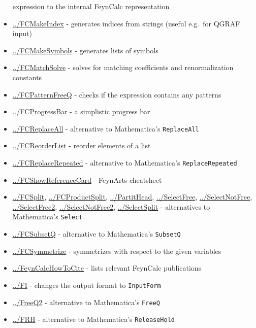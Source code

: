 \documentclass[../FeynCalcManual.tex]{subfiles}
\begin{document}
\begin{itemize}
  expression to the internal FeynCalc representation
\item
  \hyperlink{../fcmakeindex}{../FCMakeIndex} - generates indices from
  strings (useful e.g.~for QGRAF input)
\item
  \hyperlink{../fcmakesymbols}{../FCMakeSymbols} - generates lists of
  symbols
\item
  \hyperlink{../fcmatchsolve}{../FCMatchSolve} - solves for matching
  coefficients and renormalization constants
\item
  \hyperlink{../fcpatternfreeq}{../FCPatternFreeQ} - checks if the
  expression contains any patterns
\item
  \hyperlink{../fcprogressbar}{../FCProgressBar} - a simplistic progress
  bar
\item
  \hyperlink{../fcreplaceall}{../FCReplaceAll} - alternative to
  Mathematica's \texttt{ReplaceAll}
\item
  \hyperlink{../fcreorderlist}{../FCReorderList} - reorder elements of a
  list
\item
  \hyperlink{../fcreplacerepeated}{../FCReplaceRepeated} - alternative
  to Mathematica's \texttt{ReplaceRepeated}
\item
  \hyperlink{../fcshowreferencecard}{../FCShowReferenceCard} - FeynArts
  cheatsheet
\item
  \hyperlink{../fcsplit}{../FCSplit},
  \hyperlink{../fcproductsplit}{../FCProductSplit},
  \hyperlink{../partithead}{../PartitHead},
  \hyperlink{../selectfree}{../SelectFree},
  \hyperlink{../selectnotfree}{../SelectNotFree},
  \hyperlink{../selectfree2}{../SelectFree2},
  \hyperlink{../selectnotfree2}{../SelectNotFree2},
  \hyperlink{../selectsplit}{../SelectSplit} - alternatives to
  Mathematica's \texttt{Select}
\item
  \hyperlink{../fcsubsetq}{../FCSubsetQ} - alternative to Mathematica's
  \texttt{SubsetQ}
\item
  \hyperlink{../fcsymmetrize}{../FCSymmetrize} - symmetrizes with
  respect to the given variables
\item
  \hyperlink{../feyncalchowtocite}{../FeynCalcHowToCite} - lists
  relevant FeynCalc publications
\item
  \hyperlink{../fi}{../FI} - changes the output format to
  \texttt{InputForm}
\item
  \hyperlink{../freeq2}{../FreeQ2} - alternative to Mathematica's
  \texttt{FreeQ}
\item
  \hyperlink{../frh}{../FRH} - alternative to Mathematica's
  \texttt{ReleaseHold}

\end{itemize}
\end{document}
